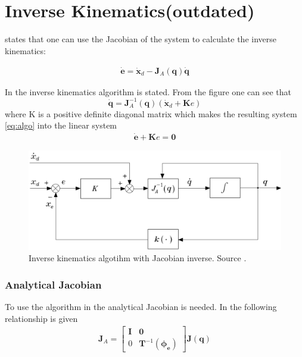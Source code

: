 \section{Inverse Kinematics(outdated)}
\cite{Siciliano} states that one can use the Jacobian of the system to calculate the inverse kinematics:

\begin{align}\label{eq:algo}
\dot{\bm{e}} = \dot{\bm{x}}_d - \bm{J}_A(\bm{q})\dot{\bm{q}}
\end{align}

In  the inverse kinematics algorithm is stated. From the figure one can see that 
$$
\dot{\bm{q}} = \bm{J}_A^{-1}(\bm{q})(\dot{\bm{x}}_d + \bm{K}e)
$$
where K is a positive definite diagonal matrix which makes the resulting system \eqref{eq:algo} into the linear system
\begin{align*}
    \dot{\bm{e}} + \bm{K}e = \bm{0}
\end{align*}


\begin{figure}[htbp]
  \centering
  \includegraphics[width=.9\textwidth]{img/inverseKin.png}
  \caption{Inverse kinematics algotihm with Jacobian inverse. Source \cite{Siciliano}.}
  \label{fig:inverseAlgo}
\end{figure}

\subsubsection*{Analytical Jacobian}
To use the algorithm in  the analytical Jacobian is needed. In \cite{Siciliano} the following relationship is given
\begin{align*}
    \bm{J}_A =
    \begin{bmatrix}
        \bm{I} & \bm{0}\\ 0 & \bm{T}^{-1}(\bm{\phi_e})
    \end{bmatrix}
    \bm{J}(\bm{q})
\end{align*}


